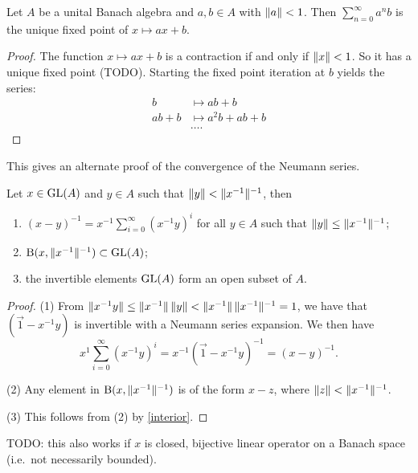 \begin{lemma}
Let $A$ be a unital Banach algebra and $a,b\in A$ with $\lVert a\rVert < 1$. Then $\sum_{n=0}^\infty a^nb$ is the unique fixed point of $x\mapsto ax+b$.
\end{lemma}
\begin{proof}
The function $x\mapsto ax+b$ is a contraction if and only if $\lVert x\rVert<1$. So it has a unique fixed point (TODO). Starting the fixed point iteration at $b$ yields the series:
\begin{align*}
b &\mapsto  ab+b \\
ab+b &\mapsto a^2b + ab + b \\
&\hdots.
\end{align*}
\end{proof}
This gives an alternate proof of the convergence of the Neumann series.

\begin{proposition} \label{openSetInvertibles}
Let $x\in\operatorname{GL}(A)$ and $y\in A$ such that $\lVert y\rVert < \lVert x^{-1}\rVert^{-1}$, then
\begin{enumerate}
\item $(x-y)^{-1} = x^{-1}\sum_{i=0}^\infty(x^{-1}y)^i$ for all $y\in A$ such that $\lVert y\rVert\leq \lVert x^{-1}\rVert^{-1}$;
\item $\operatorname{B}(x,\lVert x^{-1}\rVert^{-1})\subset \operatorname{GL}(A)$;
\item the invertible elements $\operatorname{GL}(A)$ form an open subset of $A$.
\end{enumerate}
\end{proposition}
\begin{proof}
(1) From $\lVert x^{-1}y\rVert \leq \lVert x^{-1}\rVert\,\lVert y\rVert < \lVert x^{-1}\rVert\,\lVert x^{-1}\rVert^{-1} = 1$, we have that $(\vec{1} - x^{-1}y)$ is invertible with a Neumann series expansion. We then have
\[ x^{1}\sum_{i=0}^\infty (x^{-1}y)^i = x^{-1}(\vec{1} - x^{-1}y)^{-1} = (x-y)^{-1}. \]

(2) Any element in  $\operatorname{B}(x,\lVert x^{-1}\rVert^{-1})$ is of the form $x-z$, where $\lVert z\rVert < \lVert x^{-1}\rVert^{-1}$.

(3) This follows from (2) by \ref{interior}.
\end{proof}
TODO: this also works if $x$ is closed, bijective linear operator on a Banach space (i.e.\ not necessarily bounded).

